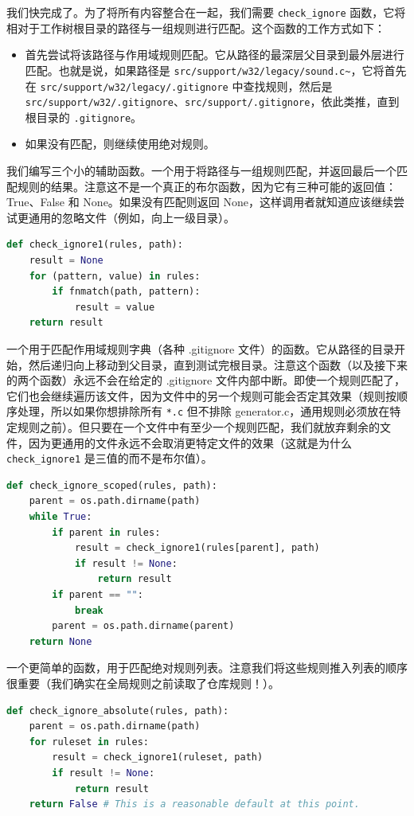 \documentclass{ctexart}
\theoremstyle{remark}
\theoremstyle{warningstyle}
\theoremstyle{warningstyle}
\begin{document}
我们快完成了。为了将所有内容整合在一起，我们需要 \lstinline|check_ignore| 函数，它将相对于工作树根目录的路径与一组规则进行匹配。这个函数的工作方式如下：
\begin{itemize}
    \item 首先尝试将该路径与作用域规则匹配。它从路径的最深层父目录到最外层进行匹配。也就是说，如果路径是 \lstinline|src/support/w32/legacy/sound.c~|，它将首先在 \lstinline|src/support/w32/legacy/.gitignore| 中查找规则，然后是 \lstinline|src/support/w32/.gitignore|、\lstinline|src/support/.gitignore|，依此类推，直到根目录的 \lstinline|.gitignore|。
    \item 如果没有匹配，则继续使用绝对规则。
\end{itemize}
我们编写三个小的辅助函数。一个用于将路径与一组规则匹配，并返回最后一个匹配规则的结果。注意这不是一个真正的布尔函数，因为它有三种可能的返回值：True、False 和 None。如果没有匹配则返回 None，这样调用者就知道应该继续尝试更通用的忽略文件（例如，向上一级目录）。
\begin{lstlisting}[language=Python]
def check_ignore1(rules, path):
    result = None
    for (pattern, value) in rules:
        if fnmatch(path, pattern):
            result = value
    return result
\end{lstlisting}
一个用于匹配作用域规则字典（各种 .gitignore 文件）的函数。它从路径的目录开始，然后递归向上移动到父目录，直到测试完根目录。注意这个函数（以及接下来的两个函数）永远不会在给定的 .gitignore 文件内部中断。即使一个规则匹配了，它们也会继续遍历该文件，因为文件中的另一个规则可能会否定其效果（规则按顺序处理，所以如果你想排除所有 \lstinline|*.c| 但不排除 generator.c，通用规则必须放在特定规则之前）。但只要在一个文件中有至少一个规则匹配，我们就放弃剩余的文件，因为更通用的文件永远不会取消更特定文件的效果（这就是为什么 \lstinline|check_ignore1| 是三值的而不是布尔值）。
\begin{lstlisting}[language=Python]
def check_ignore_scoped(rules, path):
    parent = os.path.dirname(path)
    while True:
        if parent in rules:
            result = check_ignore1(rules[parent], path)
            if result != None:
                return result
        if parent == "":
            break
        parent = os.path.dirname(parent)
    return None
\end{lstlisting}
一个更简单的函数，用于匹配绝对规则列表。注意我们将这些规则推入列表的顺序很重要（我们确实在全局规则之前读取了仓库规则！）。
\begin{lstlisting}[language=Python]
def check_ignore_absolute(rules, path):
    parent = os.path.dirname(path)
    for ruleset in rules:
        result = check_ignore1(ruleset, path)
        if result != None:
            return result
    return False # This is a reasonable default at this point.
\end{lstlisting}
\end{document}
